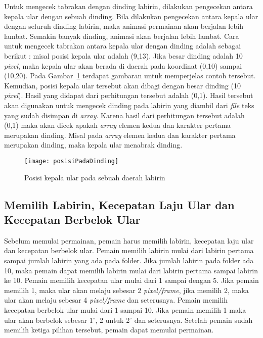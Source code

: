 Untuk mengecek tabrakan dengan dinding labirin, dilakukan pengecekan antara kepala ular dengan sebuah dinding. Bila dilakukan pengecekan antara kepala ular dengan seluruh dinding labirin, maka animasi permainan akan berjalan lebih lambat. Semakin banyak dinding, animasi akan berjalan lebih lambat. Cara untuk mengecek tabrakan antara kepala ular dengan dinding adalah sebagai berikut : misal posisi kepala ular adalah (9,13). Jika besar dinding adalah 10 \textit{pixel}, maka kepala ular akan berada di daerah pada koordinat (0,10) sampai (10,20). Pada Gambar~\ref{fig:posisiPadaDinding} terdapat gambaran untuk memperjelas contoh tersebut. Kemudian, posisi kepala ular tersebut akan dibagi dengan besar dinding (10 \textit{pixel}). Hasil yang didapat dari perhitungan tersebut adalah (0,1). Hasil tersebut akan digunakan untuk mengecek dinding pada labirin yang diambil dari \textit{file} teks yang sudah disimpan di \textit{array}. Karena hasil dari perhitungan tersebut adalah (0,1) maka akan dicek apakah \textit{array} elemen kedua dan karakter pertama merupakan dinding. Misal pada \textit{array} elemen kedua dan karakter pertama merupakan dinding, maka kepala ular menabrak dinding.

\begin{figure}[H]
	\centering  
	\texttt{[image: posisiPadaDinding]}  
	\caption[Posisi kepala ular pada sebuah daerah labirin]{Posisi kepala ular pada sebuah daerah labirin}
	\label{fig:posisiPadaDinding} 
\end{figure}

\subsection{Memilih Labirin, Kecepatan Laju Ular dan Kecepatan Berbelok Ular}
Sebelum memulai permainan, pemain harus memilih labirin, kecepatan laju ular dan kecepatan berbelok ular. Pemain memilih labirin mulai dari labirin pertama sampai jumlah labirin yang ada pada folder. Jika jumlah labirin pada folder ada 10, maka pemain dapat memilih labirin mulai dari labirin pertama sampai labirin ke 10. Pemain memilih kecepatan ular mulai dari 1 sampai dengan 5. Jika pemain memilih 1, maka ular akan melaju sebesar 2 \textit{pixel/frame}, jika memilih 2, maka ular akan melaju sebesar 4 \textit{pixel/frame} dan seterusnya. Pemain memilih kecepatan berbelok ular mulai dari 1 sampai 10. Jika pemain memilih 1 maka ular akan berbelok sebesar 1$^\circ$, 2 untuk 2$^\circ$ dan seterusnya. Setelah pemain sudah memilih ketiga pilihan tersebut, pemain dapat memulai permainan.

